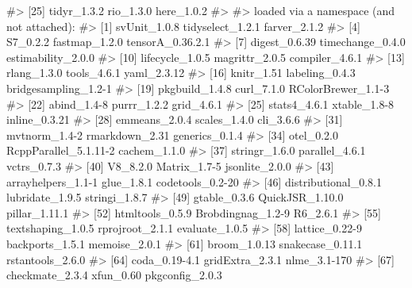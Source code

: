 \documentclass[
  italian,
  letterpaper,
  a4paper,
  11pt,
  open=any]{scrbook}
\newenvironment{Shaded}{\begin{snugshade}}{\end{snugshade}}
\newcommand{\CommentTok}[1]{\textcolor[rgb]{0.37,0.37,0.37}{#1}}
\theoremstyle{plain}
\theoremstyle{definition}
\theoremstyle{definition}
\theoremstyle{remark}
\begin{document}
\begin{tcolorbox}
\begin{Shaded}
\begin{Highlighting}[]
\CommentTok{\#\textgreater{} [25] tidyr\_1.3.2           rio\_1.3.0             here\_1.0.2           }
\CommentTok{\#\textgreater{} }
\CommentTok{\#\textgreater{} loaded via a namespace (and not attached):}
\CommentTok{\#\textgreater{}  [1] svUnit\_1.0.8          tidyselect\_1.2.1      farver\_2.1.2         }
\CommentTok{\#\textgreater{}  [4] S7\_0.2.2              fastmap\_1.2.0         tensorA\_0.36.2.1     }
\CommentTok{\#\textgreater{}  [7] digest\_0.6.39         timechange\_0.4.0      estimability\_2.0.0   }
\CommentTok{\#\textgreater{} [10] lifecycle\_1.0.5       magrittr\_2.0.5        compiler\_4.6.1       }
\CommentTok{\#\textgreater{} [13] rlang\_1.3.0           tools\_4.6.1           yaml\_2.3.12          }
\CommentTok{\#\textgreater{} [16] knitr\_1.51            labeling\_0.4.3        bridgesampling\_1.2{-}1 }
\CommentTok{\#\textgreater{} [19] pkgbuild\_1.4.8        curl\_7.1.0            RColorBrewer\_1.1{-}3   }
\CommentTok{\#\textgreater{} [22] abind\_1.4{-}8           purrr\_1.2.2           grid\_4.6.1           }
\CommentTok{\#\textgreater{} [25] stats4\_4.6.1          xtable\_1.8{-}8          inline\_0.3.21        }
\CommentTok{\#\textgreater{} [28] emmeans\_2.0.4         scales\_1.4.0          cli\_3.6.6            }
\CommentTok{\#\textgreater{} [31] mvtnorm\_1.4{-}2         rmarkdown\_2.31        generics\_0.1.4       }
\CommentTok{\#\textgreater{} [34] otel\_0.2.0            RcppParallel\_5.1.11{-}2 cachem\_1.1.0         }
\CommentTok{\#\textgreater{} [37] stringr\_1.6.0         parallel\_4.6.1        vctrs\_0.7.3          }
\CommentTok{\#\textgreater{} [40] V8\_8.2.0              Matrix\_1.7{-}5          jsonlite\_2.0.0       }
\CommentTok{\#\textgreater{} [43] arrayhelpers\_1.1{-}1    glue\_1.8.1            codetools\_0.2{-}20     }
\CommentTok{\#\textgreater{} [46] distributional\_0.8.1  lubridate\_1.9.5       stringi\_1.8.7        }
\CommentTok{\#\textgreater{} [49] gtable\_0.3.6          QuickJSR\_1.10.0       pillar\_1.11.1        }
\CommentTok{\#\textgreater{} [52] htmltools\_0.5.9       Brobdingnag\_1.2{-}9     R6\_2.6.1             }
\CommentTok{\#\textgreater{} [55] textshaping\_1.0.5     rprojroot\_2.1.1       evaluate\_1.0.5       }
\CommentTok{\#\textgreater{} [58] lattice\_0.22{-}9        backports\_1.5.1       memoise\_2.0.1        }
\CommentTok{\#\textgreater{} [61] broom\_1.0.13          snakecase\_0.11.1      rstantools\_2.6.0     }
\CommentTok{\#\textgreater{} [64] coda\_0.19{-}4.1         gridExtra\_2.3.1       nlme\_3.1{-}170         }
\CommentTok{\#\textgreater{} [67] checkmate\_2.3.4       xfun\_0.60             pkgconfig\_2.0.3}
\end{Highlighting}
\end{Shaded}

\end{tcolorbox}
\end{document}
